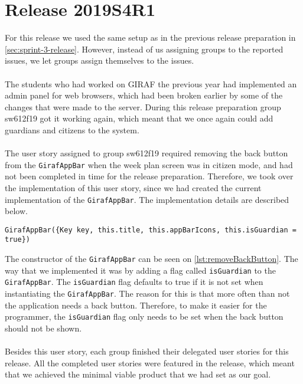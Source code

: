 \section{Release 2019S4R1}
For this release we used the same setup as in the previous release preparation in \autoref{sec:sprint-3-release}. 
However, instead of us assigning groups to the reported issues, we let groups assign themselves to the issues.
\\\\
The students who had worked on GIRAF the previous year had implemented an admin panel for web browsers, which had been broken earlier by some of the changes that were made to the server.
During this release preparation group sw612f19 got it working again, which meant that we once again could add guardians and citizens to the system.
\\\\
The user story assigned to group sw612f19 required removing the back button from the \texttt{GirafAppBar} when the week plan screen was in citizen mode, and had not been completed in time for the release preparation.
Therefore, we took over the implementation of this user story, since we had created the current implementation of the \texttt{GirafAppBar}.
The implementation details are described below.
\begin{lstlisting}[caption={Removing back button from the citizens screen},label={lst:removeBackButton}]
    GirafAppBar({Key key, this.title, this.appBarIcons, this.isGuardian = true})
\end{lstlisting}
The constructor of the \texttt{GirafAppBar} can be seen on \autoref{lst:removeBackButton}. 
The way that we implemented it was by adding a flag called \texttt{isGuardian} to the \texttt{GirafAppBar}. 
The \texttt{isGuardian} flag defaults to true if it is not set when instantiating the \texttt{GirafAppBar}.
The reason for this is that more often than not the application needs a back button.
Therefore, to make it easier for the programmer, the \texttt{isGuardian} flag only needs to be set when the back button should not be shown.
\\\\
Besides this user story, each group finished their delegated user stories for this release.
All the completed user stories were featured in the release, which meant that we achieved the minimal viable product that we had set as our goal. 
